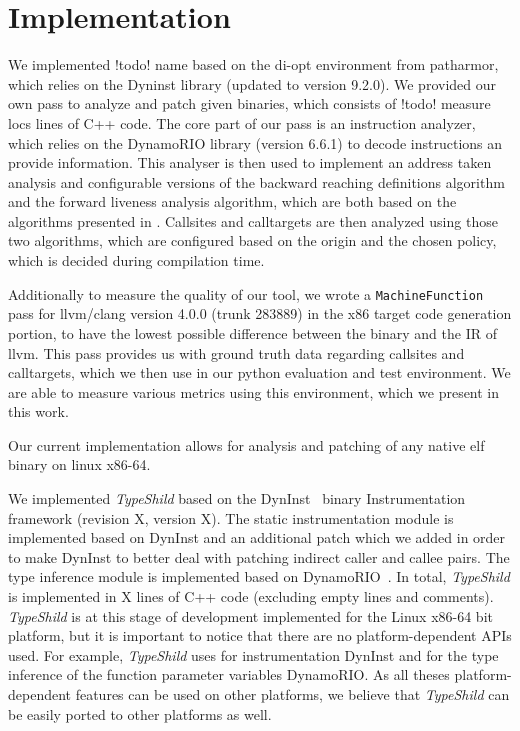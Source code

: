 \chapter{Implementation}
\label{chapter:Implementation}
We implemented {!todo! name} based on the di-opt environment from patharmor\cite{patharmor}, which relies on the Dyninst library \cite{dyninst} (updated to version 9.2.0). We provided our own pass to analyze and patch given binaries, which consists of {!todo! measure locs} lines of C++ code. The core part of our pass is an instruction analyzer, which relies on the DynamoRIO library \cite{dynamorio} (version 6.6.1) to decode instructions an provide information. This analyser is then used to implement an address taken analysis and configurable versions of the backward reaching definitions algorithm and the forward liveness analysis algorithm, which are both based on the algorithms presented in \cite{typearmor}. Callsites and calltargets are then analyzed using those two algorithms, which are configured based on the origin and the chosen policy, which is decided during compilation time.

Additionally to measure the quality of our tool, we wrote a \texttt{MachineFunction} pass for llvm/clang version 4.0.0 (trunk 283889) in the x86 target code generation portion, to have the lowest possible difference between the binary and the IR of llvm. This pass provides us with ground truth data regarding callsites and calltargets, which we then use in our python evaluation and test environment. We are able to measure various metrics using this environment, which we present in this work.

Our current implementation allows for analysis and patching of any native elf binary on linux x86-64. 


We implemented \textit{TypeShild} based on the DynInst~\cite{bernat:dyninst}
binary Instrumentation framework (revision X, version X).
The static instrumentation module is implemented based on DynInst
and an additional patch which we added in order to make DynInst to
better deal with patching indirect caller and callee pairs.
The type inference module is implemented based on DynamoRIO~\cite{dynamorio:drmemory}.
In total, \textit{TypeShild} is implemented in X lines of C++ 
code (excluding empty lines and comments).
\textit{TypeShild} is at this stage of development implemented 
for the Linux x86-64 bit platform, but it is important to notice that there are
no platform-dependent APIs used.
For example, \textit{TypeShild} uses for instrumentation
DynInst and for the type inference of the function parameter variables
DynamoRIO. As all theses platform-dependent features can be used on other platforms,
we believe that \textit{TypeShild} can be easily ported to other platforms as well.

